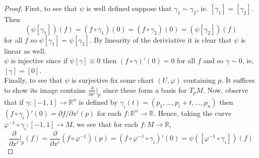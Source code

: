 \documentclass{article}
\newcommand{\bR}{\mathbb{R}}
\newcommand{\vp}{\varphi}
\theoremstyle{definition}
\begin{document}
\begin{proof}
    First, to see that $\psi$ is well defined suppose that $\gamma_1 \sim \gamma_2$, ie. $[\gamma_1] = [\gamma_2]$. Then 
    \[ (\psi[\gamma_1])(f) = (f \circ \gamma_1)(0) = (f \circ \gamma_2)(0) = (\psi[\gamma_2])(f) \] 
    for all $f$ so $\psi[\gamma_1] = \psi[\gamma_2]$. By linearity of the deriviative it is clear that $\psi$ is linear as well. \\ 
$\psi$ is injective since if $\psi[\gamma] \equiv 0$ then $(f \circ \gamma)'(0)=0$ for all $f$ and so $\gamma \sim 0$, ie, $[\gamma]= [0]$. \\ 
Finally, to see that $\psi$ is surjective fix some chart $(U, \vp)$ containing $p$. It suffices to show its image contains $\frac{\partial}{\partial x^i}|_p$ since these form a basis for $T_pM$. Now, observe that if $\gamma: [-1,1] \to \bR^n$ is defined by $\gamma_i(t) = (p_1, \ldots, p_i+t, \ldots, p_n)$ then $(f \circ \gamma_i)'(0) = \partial f/\partial x^i (p)$ for each $f: \bR^n \to \bR$. Hence, taking the curve $\vp^{-1} \circ \gamma_i: [-1,1] \to M$, we see that for each $f: M \to \bR$, 
\[ \frac{\partial}{\partial x^i}|_p(f) = \frac{\partial}{\partial x^i}(f \circ \vp^{-1})(p)  = (f \circ \vp^{-1} \circ \gamma_i)'(0) = \psi([\vp^{-1} \circ \gamma_i])(f)  \]
\end{proof}
\end{document}
